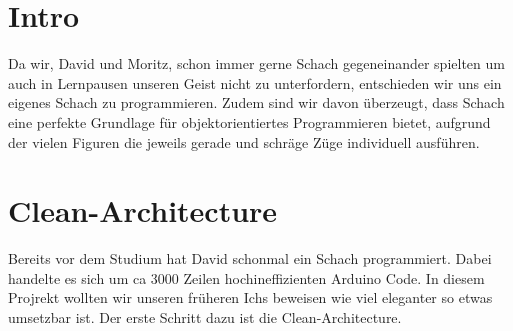 \documentclass[
10pt, %
a4paper, %
oneside, %
headinclude,footinclude, %
BCOR5mm, %
]{scrartcl}
\title{\normalfont\spacedallcaps{Programmentwurf}} %
\subtitle{Check-Mate} %
\author{\spacedlowsmallcaps{David Schmidt \& Moritz Knapp}} %
\date{} %
\begin{document}

\renewcommand{\sectionmark}[1]{\markright{\spacedlowsmallcaps{#1}}} %
\lehead{\mbox{\llap{\small\thepage\kern1em\color{halfgray} \vline}\color{halfgray}\hspace{0.5em}\rightmark\hfil}} %

\pagestyle{scrheadings} %


\maketitle %

\setcounter{tocdepth}{2} %

\tableofcontents %

\listoffigures %

\newpage %

\section{Intro}

Da wir, David und Moritz, schon immer gerne Schach gegeneinander spielten um auch in Lernpausen unseren Geist nicht zu unterfordern, entschieden wir uns ein eigenes Schach zu programmieren. 
Zudem sind wir davon überzeugt, dass Schach eine perfekte Grundlage für objektorientiertes Programmieren bietet, aufgrund der vielen Figuren die jeweils gerade und schräge Züge individuell ausführen.

\section{Clean-Architecture} \label{sec:cleanArc}
Bereits vor dem Studium hat David schonmal ein Schach programmiert. Dabei handelte es sich um ca 3000 Zeilen hochineffizienten Arduino Code. In diesem Projrekt wollten wir unseren früheren Ichs beweisen wie viel eleganter so etwas umsetzbar ist. Der erste Schritt dazu ist die Clean-Architecture.
\end{document}
